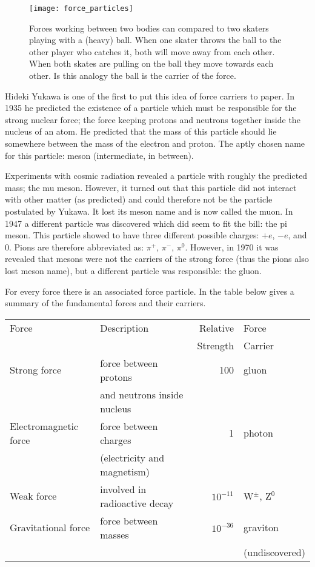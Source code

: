 \begin{figure}\begin{center}
\texttt{[image: force\_particles]}%
\caption{Forces working between two bodies can compared to two skaters playing with a (heavy) ball. When one skater throws the ball to the other player who catches it, both will move away from each other. When both skates are pulling on the ball they move towards each other. Is this analogy the ball is the carrier of the force.}\label{fig:force_particles}
\end{center}\end{figure}

Hideki Yukawa is one of the first to put this idea of force carriers to paper. In 1935 he predicted the existence of a particle which must be responsible for the strong nuclear force; the force keeping protons and neutrons together inside the nucleus of an atom. He predicted that the mass of this particle should lie somewhere between the mass of the electron and proton. The aptly chosen name for this particle: meson (intermediate, in between).

Experiments with cosmic radiation revealed a particle with roughly the predicted mass; the mu meson. However, it turned out that this particle did not interact with other matter (as predicted) and could therefore not be the particle postulated by Yukawa. It lost its meson name and is now called the muon. In 1947 a different particle was discovered which did seem to fit the bill: the pi meson. This particle showed to have three different possible charges: $+e$, $-e$, and $0$. Pions are therefore abbreviated as: $\pi^+$, $\pi^-$, $\pi^0$. However, in 1970 it was revealed that mesons were not the carriers of the strong force (thus the pions also lost meson name), but a different particle was responsible: the gluon.

For every force there is an associated force particle. In the table below gives a summary of the fundamental forces and their carriers.

\begin{center}\begin{tabular}[h] {l l r l}
Force & Description & Relative & Force  \\
& & Strength & Carrier\\\hline
Strong force & force between protons  & 100 & gluon \\
& and neutrons inside nucleus\\
Electromagnetic force & force between charges & 1 & photon \\
& (electricity and magnetism) \\
Weak force & involved in radioactive decay & $10^{-11}$ & W$^\pm$, Z$^0$ \\
Gravitational force & force between masses & $10^{-36}$ & graviton \\
& & & (undiscovered)
\end{tabular}\end{center}
\label{tab:data_1}

